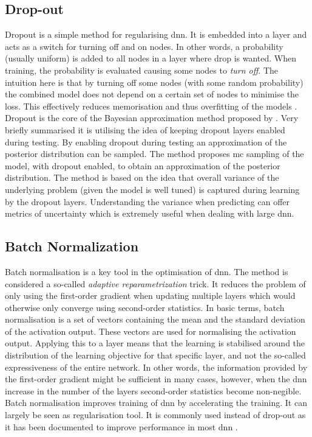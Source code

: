 \subsection{Drop-out}\label{subsec:dropout}
Dropout is a simple method for regularising \gls{dnn}. It is embedded into a layer and acts as a switch for turning off and on nodes. In other words, a probability (usually uniform) is added to all nodes in a layer where drop is wanted. When training, the probability is evaluated causing some nodes to \emph{turn off}. The intuition here is that by turning off some nodes (with some random probability) the combined model does not depend on a certain set of nodes to minimise the loss. This effectively reduces memorisation and thus overfitting of the models \cite{Goodfellow-et-al-2016}. Dropout is the core of the Bayesian approximation method proposed by \cite{Gal2015DropoutLearning}. Very briefly summarised it is utilising the idea of keeping dropout layers enabled during testing. By enabling dropout during testing an approximation of the posterior distribution can be sampled. The method proposes \gls{mc} sampling of the model, with dropout enabled, to obtain an approximation of the posterior distribution. The method is based on the idea that overall variance of the underlying problem (given the model is well tuned) is captured during learning by the dropout layers. Understanding the variance when predicting can offer metrics of uncertainty which is extremely useful when dealing with large \gls{dnn}.



\subsection{Batch Normalization}\label{subsec:batch_normalization}
Batch normalisation is a key tool in the optimisation of \gls{dnn}. The method is considered a so-called \emph{adaptive reparametrization} trick. It reduces the problem of only using the first-order gradient when updating multiple layers which would otherwise only converge using second-order statistics. In basic terms, batch normalisation is a set of vectors containing the mean and the standard deviation of the activation output. These vectors are used for normalising the activation output. Applying this to a layer means that the learning is stabilised around the distribution of the learning objective for that specific layer, and not the so-called expressiveness of the entire network. In other words, the information provided by the first-order gradient might be sufficient in many cases, however, when the \gls{dnn} increase in the number of the layers second-order statistics become non-negible. Batch normalisation improves training of \gls{dnn} by accelerating the training. It can largely be seen as regularisation tool. It is commonly used instead of drop-out as it has been documented to improve performance in most \gls{dnn} \cite{Goodfellow-et-al-2016}.




